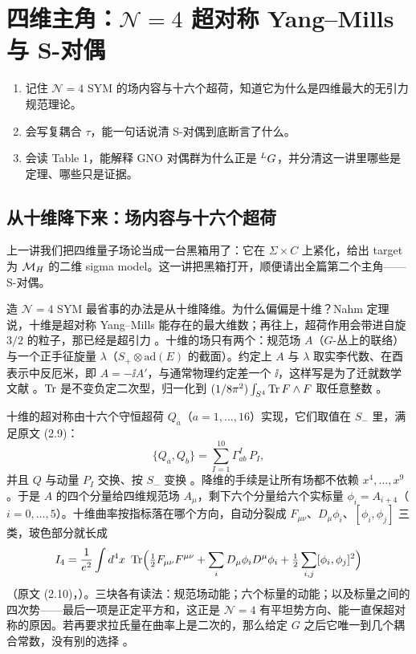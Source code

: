 \section{四维主角：$\mathcal{N}=4$ 超对称 Yang--Mills 与 S-对偶}
\label{sec:physics}

\begin{goals}
\begin{enumerate}
\item 记住 $\mathcal N=4$ SYM 的场内容与十六个超荷，知道它为什么是四维最大的无引力规范理论。
\item 会写复耦合 $\tau$，能一句话说清 S-对偶到底断言了什么。
\item 会读 Table 1，能解释 GNO 对偶群为什么正是 ${}^{L}G$，并分清这一讲里哪些是定理、哪些只是证据。
\end{enumerate}
\end{goals}

\subsection{从十维降下来：场内容与十六个超荷}

上一讲我们把四维量子场论当成一台黑箱用了：它在 $\Sigma\times C$ 上紧化，给出 target 为 $\mathcal{M}_{H}$ 的二维 sigma model。这一讲把黑箱打开，顺便请出全篇第二个主角——S-对偶。

造 $\mathcal N=4$ SYM 最省事的办法是从十维降维。为什么偏偏是十维？Nahm 定理说，十维是超对称 Yang--Mills 能存在的最大维数；再往上，超荷作用会带进自旋 $3/2$ 的粒子，那已经是超引力 。十维的场只有两个：规范场 $A$（$G$-丛上的联络）与一个正手征旋量 $\lambda$（$S_+\otimes\mathrm{ad}(E)$ 的截面）。约定上 $A$ 与 $\lambda$ 取实李代数、在酉表示中反厄米，即 $A=-\ii A'$，与通常物理约定差一个 $\ii$，这样写是为了迁就数学文献 。$\operatorname{Tr}$ 是不变负定二次型，归一化到 $(1/8\pi^2)\int_{S^4}\operatorname{Tr} F\wedge F$ 取任意整数 。

十维的超对称由十六个守恒超荷 $Q_a$（$a=1,\dots,16$）实现，它们取值在 $S_-$ 里，满足原文 (2.9)：
\[
\{Q_a,Q_b\}=\sum_{I=1}^{10}\Gamma^I_{ab}\,P_I ,
\]
并且 $Q$ 与动量 $P_I$ 交换、按 $S_-$ 变换 。降维的手续是让所有场都不依赖 $x^4,\dots,x^9$。于是 $A$ 的四个分量给四维规范场 $A_\mu$，剩下六个分量给六个实标量 $\phi_i=A_{i+4}$（$i=0,\dots,5$）。十维曲率按指标落在哪个方向，自动分裂成 $F_{\mu\nu}$、$D_\mu\phi_i$、$[\phi_i,\phi_j]$ 三类，玻色部分就长成
\[
I_4=\frac{1}{e^2}\int d^4x\ \operatorname{Tr}\Bigl(\tfrac12 F_{\mu\nu}F^{\mu\nu}
+\sum_i D_\mu\phi_i D^\mu\phi_i+\tfrac12\sum_{i,j}[\phi_i,\phi_j]^2\Bigr)
\]
（原文 (2.10)，）。三块各有读法：规范场动能；六个标量的动能；以及标量之间的四次势——最后一项是正定平方和，这正是 $\mathcal N=4$ 有平坦势方向、能一直保超对称的原因。若再要求拉氏量在曲率上是二次的，那么给定 $G$ 之后它唯一到几个耦合常数，没有别的选择 。

